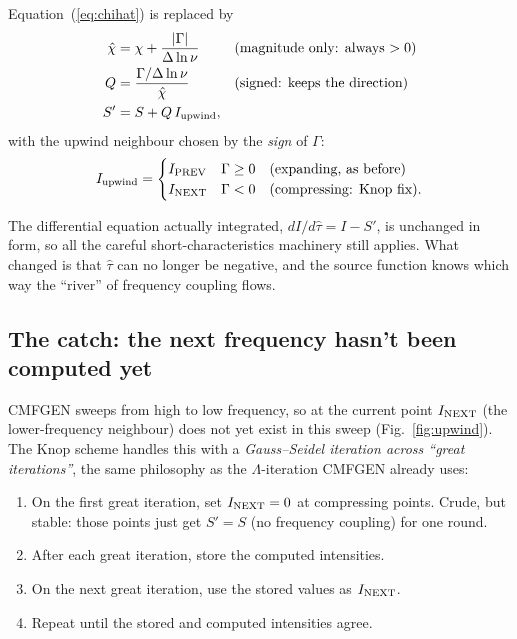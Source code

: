 \documentclass[11pt,a4paper]{article}
\begin{document}
Equation~(\ref{eq:chihat}) is replaced by
\begin{align}
  \hat\chi &= \chi + \frac{|\Gamma|}{\Delta\ln\nu}
             &&\text{(magnitude only: always $>0$)}
             \label{eq:knop-chi}\\
  Q        &= \frac{\Gamma/\Delta\ln\nu}{\hat\chi}
             &&\text{(signed: keeps the direction)}
             \label{eq:knop-Q}\\
  S'       &= S + Q\,I_{\rm upwind},
  \label{eq:knop-src}
\end{align}
with the upwind neighbour chosen by the \emph{sign} of $\Gamma$:
\begin{equation}
  I_{\rm upwind} =
  \begin{cases}
    I_{\rm PREV} & \Gamma \ge 0 \quad\text{(expanding, as before)}\\
    I_{\rm NEXT} & \Gamma < 0 \quad\text{(compressing: Knop fix)} .
  \end{cases}
  \label{eq:upwind}
\end{equation}

The differential equation actually integrated, $dI/d\hat\tau = I - S'$,
is unchanged in form, so all the careful short-characteristics
machinery still applies.  What changed is that $\hat\tau$ can no longer
be negative, and the source function knows which way the ``river'' of
frequency coupling flows.

\subsection{The catch: the next frequency hasn't been computed yet}

CMFGEN sweeps from high to low frequency, so at the current point
$I_{\rm NEXT}$ (the lower-frequency neighbour) does not yet exist in
this sweep (Fig.~\ref{fig:upwind}).  The Knop scheme handles this with a
\emph{Gauss--Seidel iteration across ``great iterations''}, the same
philosophy as the $\Lambda$-iteration CMFGEN already uses:

\begin{enumerate}[nosep]
  \item On the first great iteration, set $I_{\rm NEXT} = 0$ at
        compressing points.  Crude, but stable: those points just get
        $S' = S$ (no frequency coupling) for one round.
  \item After each great iteration, store the computed intensities.
  \item On the next great iteration, use the stored values as
        $I_{\rm NEXT}$.
  \item Repeat until the stored and computed intensities agree.
\end{enumerate}
\end{document}
